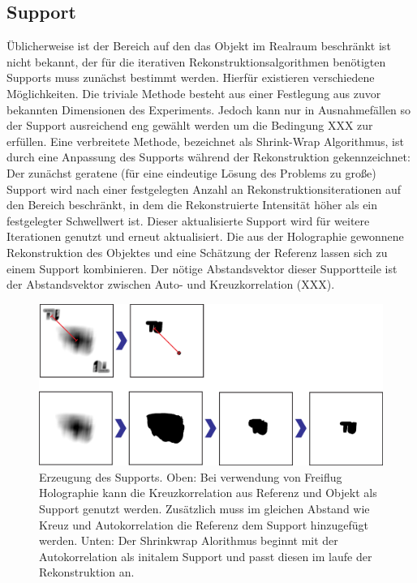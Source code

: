 \subsection{Support}
Üblicherweise ist der Bereich auf den das Objekt im Realraum beschränkt ist nicht bekannt, der für die iterativen Rekonstruktionsalgorithmen benötigten Supports muss zunächst bestimmt werden. Hierfür existieren verschiedene Möglichkeiten. Die triviale Methode besteht aus einer Festlegung aus zuvor bekannten Dimensionen des Experiments. Jedoch kann nur in Ausnahmefällen so der Support ausreichend eng gewählt werden um die Bedingung XXX zur erfüllen.
Eine verbreitete Methode, bezeichnet als Shrink-Wrap Algorithmus, ist durch eine Anpassung des Supports während der Rekonstruktion gekennzeichnet: Der zunächst geratene (für eine eindeutige Lösung des Problems  zu große) Support wird nach einer festgelegten Anzahl an Rekonstruktionsiterationen auf den Bereich beschränkt, in dem die Rekonstruierte Intensität höher als ein festgelegter Schwellwert ist. Dieser aktualisierte Support wird für weitere Iterationen genutzt und erneut aktualisiert\cite{marchesini2003}.
Die aus der Holographie gewonnene Rekonstruktion des Objektes und eine Schätzung der Referenz lassen sich zu einem Support kombinieren. Der nötige Abstandsvektor dieser Supportteile ist der  Abstandsvektor zwischen Auto- und Kreuzkorrelation (XXX).

	\begin{figure}
		\centering
		\includegraphics[width=.9\textwidth]{images/support.eps}
		\caption[Supportgenerierung]{Erzeugung des Supports. Oben: Bei verwendung von Freiflug Holographie kann die Kreuzkorrelation aus Referenz und Objekt als Support genutzt werden. Zusätzlich muss im gleichen Abstand wie Kreuz und Autokorrelation die Referenz dem Support hinzugefügt werden. Unten: Der Shrinkwrap Alorithmus beginnt mit der Autokorrelation als initalem Support und passt diesen im laufe der Rekonstruktion an.}
		\label{fig:support}
	\end{figure} 
